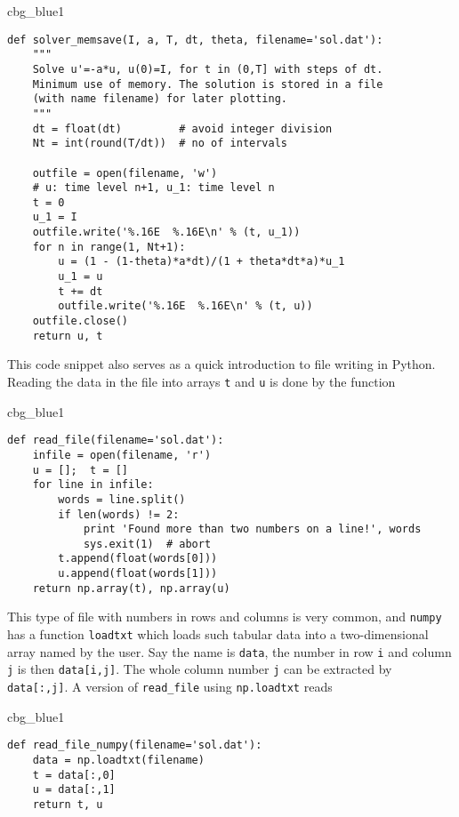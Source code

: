 \documentclass[graybox,sectrefs,envcountresetchap,open=right,final]{svmonodo}
\newenvironment{_cod_tight}[1]{
   \def\FrameCommand{\colorbox{#1}}
   \FrameRule0.6pt\MakeFramed {\FrameRestore}\vskip3mm}
   {\vskip0mm\endMakeFramed}
\newenvironment{cod}[1]{
\bgroup\rmfamily
\fboxsep=0mm\relax
\begin{_cod_tight}{#1}
\list{}{\parsep=-2mm\parskip=0mm\topsep=0pt\leftmargin=2mm
\rightmargin=2\leftmargin\leftmargin=4pt\relax}
\item\relax}
{\endlist\end{_cod_tight}\egroup}
\begin{document}
\begin{cod}{cbg_blue1}\begin{Verbatim}[numbers=none,fontsize=\fontsize{9pt}{9pt},baselinestretch=0.95,xleftmargin=2mm]
def solver_memsave(I, a, T, dt, theta, filename='sol.dat'):
    """
    Solve u'=-a*u, u(0)=I, for t in (0,T] with steps of dt.
    Minimum use of memory. The solution is stored in a file
    (with name filename) for later plotting.
    """
    dt = float(dt)         # avoid integer division
    Nt = int(round(T/dt))  # no of intervals

    outfile = open(filename, 'w')
    # u: time level n+1, u_1: time level n
    t = 0
    u_1 = I
    outfile.write('%.16E  %.16E\n' % (t, u_1))
    for n in range(1, Nt+1):
        u = (1 - (1-theta)*a*dt)/(1 + theta*dt*a)*u_1
        u_1 = u
        t += dt
        outfile.write('%.16E  %.16E\n' % (t, u))
    outfile.close()
    return u, t
\end{Verbatim}
\end{cod}
\noindent
This code snippet also serves as a quick introduction to file writing in Python.
Reading the data in the file into arrays \texttt{t} and \texttt{u} is done by the
function

\begin{cod}{cbg_blue1}\begin{Verbatim}[numbers=none,fontsize=\fontsize{9pt}{9pt},baselinestretch=0.95,xleftmargin=2mm]
def read_file(filename='sol.dat'):
    infile = open(filename, 'r')
    u = [];  t = []
    for line in infile:
        words = line.split()
        if len(words) != 2:
            print 'Found more than two numbers on a line!', words
            sys.exit(1)  # abort
        t.append(float(words[0]))
        u.append(float(words[1]))
    return np.array(t), np.array(u)
\end{Verbatim}
\end{cod}
\noindent

This type of file with numbers in rows and columns is very common, and
\texttt{numpy} has a function \texttt{loadtxt} which loads such tabular data into a
two-dimensional array named by the user. Say the name is \texttt{data}, the
number in row \texttt{i} and column \texttt{j} is then \texttt{data[i,j]}.  The whole
column number \texttt{j} can be extracted by \texttt{data[:,j]}.  A version of
\Verb!read_file! using \texttt{np.loadtxt} reads

\begin{cod}{cbg_blue1}\begin{Verbatim}[numbers=none,fontsize=\fontsize{9pt}{9pt},baselinestretch=0.95,xleftmargin=2mm]
def read_file_numpy(filename='sol.dat'):
    data = np.loadtxt(filename)
    t = data[:,0]
    u = data[:,1]
    return t, u
\end{Verbatim}
\end{cod}
\noindent
\end{document}
